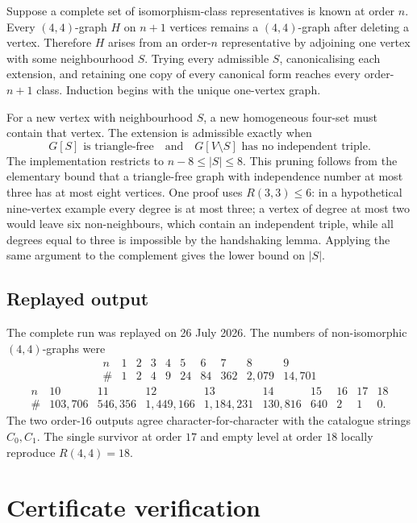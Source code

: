 \documentclass[11pt,a4paper]{article}
\theoremstyle{definition}
\theoremstyle{remark}
\begin{document}
Suppose a complete set of isomorphism-class representatives is known at
order \(n\).  Every \((4,4)\)-graph \(H\) on \(n+1\) vertices remains a
\((4,4)\)-graph after deleting a vertex.  Therefore \(H\) arises from an
order-\(n\) representative by adjoining one vertex with some neighbourhood
\(S\).  Trying every admissible \(S\), canonicalising each extension, and
retaining one copy of every canonical form reaches every order-\(n+1\)
class.  Induction begins with the unique one-vertex graph.

For a new vertex with neighbourhood \(S\), a new homogeneous four-set must
contain that vertex.  The extension is admissible exactly when
\[
  G[S]\text{ is triangle-free}
  \quad\text{and}\quad
  G[V\setminus S]\text{ has no independent triple}.
\]
The implementation restricts to \(n-8\leq |S|\leq8\).  This pruning follows
from the elementary bound that a triangle-free graph with independence
number at most three has at most eight vertices.  One proof uses
\(R(3,3)\leq6\): in a hypothetical nine-vertex example every degree is at
most three; a vertex of degree at most two would leave six non-neighbours,
which contain an independent triple, while all degrees equal to three is
impossible by the handshaking lemma.  Applying the same argument to the
complement gives the lower bound on \(|S|\).

\subsection{Replayed output}

The complete run was replayed on 26 July 2026.  The numbers of
non-isomorphic \((4,4)\)-graphs were
\[
\begin{array}{c|rrrrrrrrr}
 n&1&2&3&4&5&6&7&8&9\\ \hline
 \#&1&2&4&9&24&84&362&2{,}079&14{,}701
\end{array}
\]
\[
\begin{array}{c|rrrrrrrrr}
 n&10&11&12&13&14&15&16&17&18\\ \hline
 \#&103{,}706&546{,}356&1{,}449{,}166&1{,}184{,}231&
 130{,}816&640&2&1&0.
\end{array}
\]
The two order-\(16\) outputs agree character-for-character with the
catalogue strings \(C_0,C_1\).  The single survivor at order \(17\) and
empty level at order \(18\) locally reproduce \(R(4,4)=18\).

\section{Certificate verification}\label{sec:certificates}
\end{document}
